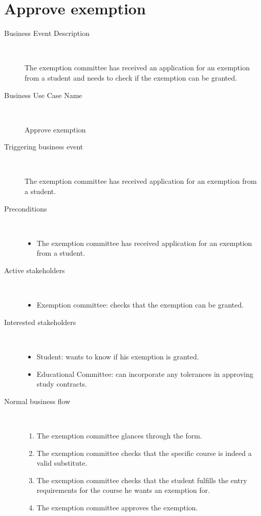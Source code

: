\section{Approve exemption}

\begin{description}
	\item[Business Event Description] \ 
		\par The exemption committee has received an application for an exemption
		from a student and needs to check if the exemption can be granted.
	\item[Business Use Case Name] \ 
		\par Approve exemption
	\item[Triggering business event] \ 
		\par The exemption committee has received application for an exemption from a
		student.
	\item[Preconditions] \
	\begin{itemize}
		\item The exemption committee has received application for an exemption from a
		student.
	\end{itemize}
	\item[Active stakeholders] \ 
	\begin{itemize}
		\item Exemption committee: checks that the exemption can be granted.
	\end{itemize}
	\item[Interested stakeholders] \ 
		\begin{itemize}
		\item Student: wants to know if his exemption is granted.
		\item Educational Committee: can incorporate any tolerances in approving
		study contracts.
		\end{itemize}
	\item[Normal business flow] \ 
	\begin{enumerate}
	  	\item The exemption committee glances through the form. 
	  	\item The exemption committee checks that the specific course is indeed a
	  	valid substitute.
	  	\item The exemption committee checks that the student fulfills the entry
	  	requirements for the course he wants an exemption for.
	  	\item The exemption committee approves the exemption.

\end{enumerate}
\end{description}
